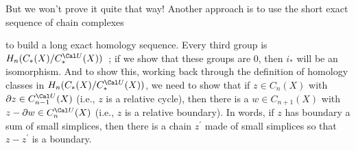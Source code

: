 \ssk

But we won't prove it quite that way! Another approach is to use the short exact sequence of chain 
complexes

\ssk


\ssk

to build a long exact homology sequence. Every third group is $H_n(C_*(X)/C_*^{\Cal U}(X))$~;
if we show that these groups are $0$, then $i_*$ will be an isomorphism. And to show \u{this},
working back through the definition of homology classes in $H_n(C_*(X)/C_*^{\Cal U}(X))$,
we need to show that if $z\in C_n(X)$ with $\del z\in C_{n-1}^{\Cal U}(X)$ (i.e., $z$ is a relative cycle), 
then there is a $w\in C_{n+1}(X)$ with $z-\del w\in C_n^{\Cal U}(X)$ (i.e., $z$ is a relative boundary).
In words, if $z$ has boundary a sum of small simplices, then there is a chain $z^\prime$
made of small simplices so that $z-z^\prime$ is a boundary.

\vfill
\eject




